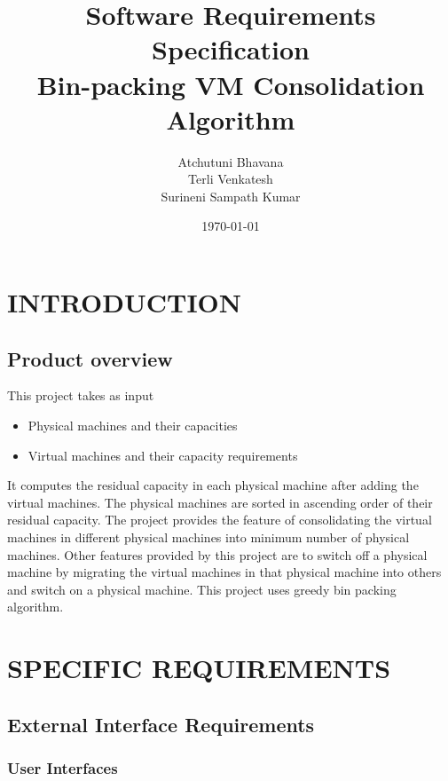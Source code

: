 \documentclass[a4paper,11pt]{article}
\title{Software Requirements Specification \\ Bin-packing VM Consolidation Algorithm}
\author{Atchutuni Bhavana \\ Terli Venkatesh \\ Surineni Sampath Kumar}
\date{\today}
\begin{document}
	\maketitle
	 \pagebreak 
	 \tableofcontents
	 \pagebreak 

	\section{INTRODUCTION}
		\subsection{Product overview}
		This project takes as  input 
		\begin{itemize}
		  \item Physical machines and their capacities
		  \item Virtual machines and their capacity requirements
		  
		\end{itemize} 
		It computes the residual capacity in each physical machine after adding the 
		virtual machines. The physical machines are sorted in ascending order of their residual capacity. 
		The project provides the feature of consolidating the virtual machines in different physical machines into 
		minimum number of physical machines. Other features provided by this project are to switch off a physical machine by migrating the virtual machines in that physical machine into 
		others and switch on a physical machine. This project uses greedy bin packing algorithm. 
		\section{SPECIFIC REQUIREMENTS}
		\subsection{External Interface Requirements}
			\subsubsection{User Interfaces}
			
\end{document}
